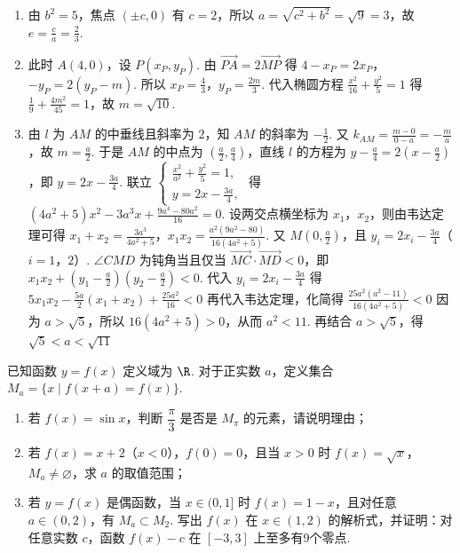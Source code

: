 \begin{solution}
\begin{enumerate}
\item 由 \(b^2=5\)，焦点 \((\pm c,0)\) 有 \(c=2\)，所以 \(a=\sqrt{c^2+b^2}=\sqrt9=3\)，故 \(e=\frac{c}{a}=\frac23\).

\item 此时 \(A(4,0)\)，设 \(P(x_P,y_P)\). 由 \(\overrightarrow{PA}=2\overrightarrow{MP}\) 得
\(4-x_P=2x_P\)，\(-y_P=2(y_P-m)\).
所以 \(x_P=\frac43\)，\(y_P=\frac{2m}{3}\). 代入椭圆方程 \(\frac{x^2}{16}+\frac{y^2}{5}=1\) 得 \(\frac{1}{9}+\frac{4m^2}{45}=1\)，故 \(m=\sqrt{10}\).

\item 由 \(l\) 为 \(AM\) 的中垂线且斜率为 \(2\)，知 \(AM\) 的斜率为 \(-\frac12\). 又 \(k_{AM}=\frac{m-0}{0-a}=-\frac{m}{a}\)，故 \(m=\frac a2\). 于是 \(AM\) 的中点为 \(\left(\frac a2,\frac a4\right)\)，直线 \(l\) 的方程为 \(y-\frac a4=2\left(x-\frac a2\right)\)，即 \(y=2x-\frac{3a}{4}\).
联立
\(
\begin{cases}
\frac{x^2}{a^2}+\frac{y^2}{5}=1,\\
y=2x-\frac{3a}{4},
\end{cases}
\)
得
\((4a^2+5)x^2-3a^3x+\frac{9a^4-80a^2}{16}=0\).
设两交点横坐标为 \(x_1\)，\(x_2\)，则由韦达定理可得
\(x_1+x_2=\frac{3a^3}{4a^2+5}\)，\(x_1x_2=\frac{a^2(9a^2-80)}{16(4a^2+5)}\).
又 \(M\left(0,\frac a2\right)\)，且 \(y_i=2x_i-\frac{3a}{4}\)（\(i=1\)，\(2\)）. \(\angle CMD\) 为钝角当且仅当 \(\overrightarrow{MC}\cdot\overrightarrow{MD}<0\)，即 \(x_1x_2+\left(y_1-\frac a2\right)\left(y_2-\frac a2\right)<0\).
代入 \(y_i=2x_i-\frac{3a}{4}\) 得
\(
5x_1x_2-\frac{5a}{2}(x_1+x_2)+\frac{25a^2}{16}<0
\)
再代入韦达定理，化简得
\(
\frac{25a^2(a^2-11)}{16(4a^2+5)}<0
\)
因为 \(a>\sqrt5\)，所以 \(16(4a^2+5)>0\)，从而 \(a^2<11\). 再结合 \(a>\sqrt5\)，得
\(
\sqrt5<a<\sqrt{11}
\)
\end{enumerate}
\end{solution}

\begin{problem}
已知函数 \(y=f(x)\) 定义域为 \(\R\). 对于正实数 \(a\)，定义集合 \(M_a=\{x\mid f(x+a)=f(x)\}\).
\begin{enumerate}
\item 若 \(f(x)=\sin x\)，判断 \(\dfrac{\pi}{3}\) 是否是 \(M_{\pi}\) 的元素，请说明理由；
\item 若 \(f(x)=x+2\)（\(x<0\)），\(f(0)=0\)，且当 \(x>0\) 时 \(f(x)=\sqrt{x}\)，\(M_a\neq\varnothing\)，求 \(a\) 的取值范围；
\item 若 \(y=f(x)\) 是偶函数，当 \(x\in(0,1]\) 时 \(f(x)=1-x\)，且对任意 \(a\in(0,2)\)，有 \(M_a\subset M_2\). 写出 \(f(x)\) 在 \(x\in(1,2)\) 的解析式，并证明：对任意实数 \(c\)，函数 \(f(x)-c\) 在 \([-3,3]\) 上至多有9个零点.
\end{enumerate}
\end{problem}

